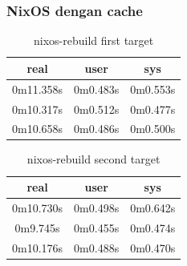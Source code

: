 \documentclass[10pt,]{report}
\begin{document}
\begin{adjustwidth}{20pt}{}
	\subsubsection{NixOS dengan cache}
	\begin{table}[H]
		\caption{nixos-rebuild first target}
		\begin{center}
			\begin{tabular}[c]{|c|c|c|}
				\hline
				\multicolumn{1}{|c|}{\textbf{real}} &
				\multicolumn{1}{c|}{\textbf{user}}  &
				\multicolumn{1}{c|}{\textbf{sys}}                         \\
				\hline
				0m11.358s                           & 0m0.483s & 0m0.553s \\
				\hline
				0m10.317s                           & 0m0.512s & 0m0.477s \\
				\hline
				0m10.658s                           & 0m0.486s & 0m0.500s \\
				\hline
			\end{tabular}
		\end{center}
	\end{table}
	\vspace{-5mm}
	\begin{table}[H]
		\caption{nixos-rebuild second target}
		\begin{center}
			\begin{tabular}[c]{|c|c|c|}
				\hline
				\multicolumn{1}{|c|}{\textbf{real}} &
				\multicolumn{1}{c|}{\textbf{user}}  &
				\multicolumn{1}{c|}{\textbf{sys}}                         \\
				\hline
				0m10.730s                           & 0m0.498s & 0m0.642s \\
				\hline
				0m9.745s                            & 0m0.455s & 0m0.474s \\
				\hline
				0m10.176s                           & 0m0.488s & 0m0.470s \\
				\hline
			\end{tabular}
		\end{center}
	\end{table}

\end{adjustwidth}
\end{document}
